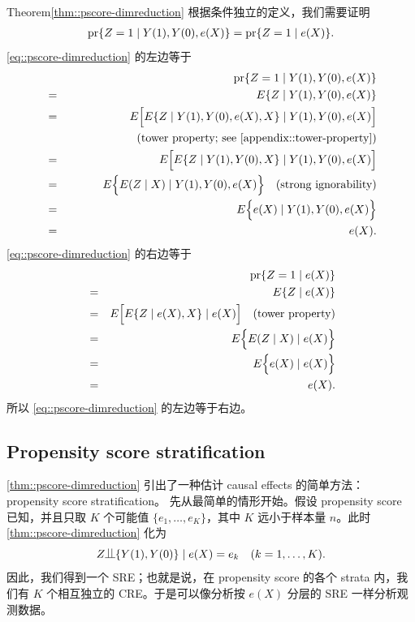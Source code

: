 \begin{myproof}{Theorem}{\cref{thm::pscore-dimreduction}}
根据条件独立的定义，我们需要证明
\begin{eqnarray}
\textup{pr}\{ Z=1\mid Y(1), Y(0), e(X)  \} = \textup{pr}\{ Z=1\mid e(X)  \} .
\label{eq::pscore-dimreduction}
\end{eqnarray}
\eqref{eq::pscore-dimreduction} 的左边等于
\begin{eqnarray*}
&&\pr\{ Z=1\mid Y(1), Y(0), e(X)  \}  \\
&=& E\{ Z \mid Y(1), Y(0), e(X)  \}  \\
&=& E\Big[   E\{ Z \mid Y(1), Y(0), e(X) , X  \}  \mid   Y(1), Y(0), e(X)    \Big]  \\
&&\quad  \quad  \quad  \quad   \quad \quad \text{(tower property; see \cref{appendix::tower-property})} \\
&=& E\Big[   E\{ Z \mid Y(1), Y(0),   X  \}  \mid   Y(1), Y(0), e(X)    \Big]  \\
&=& E\Big\{    E(Z \mid  X  )  \mid   Y(1), Y(0), e(X)    \Big\}  \quad \text{(strong ignorability)} \\
&=& E\Big\{   e(X) \mid   Y(1), Y(0), e(X)    \Big\} \\
&=& e(X).
\end{eqnarray*}
\eqref{eq::pscore-dimreduction} 的右边等于
\begin{eqnarray*}
&& \textup{pr}\{ Z=1\mid e(X)  \} \\
  &=&  E\{ Z \mid e(X)  \} \\
 &=& E\Big[   E\{ Z \mid e(X), X  \}  \mid e(X)  \Big ] \quad \text{(tower property)} \\
 &=& E\Big\{    E( Z \mid  X )  \mid e(X)  \Big \}   \\
 &=& E\Big\{   e(X)  \mid e(X)  \Big \} \\
 &=& e(X). 
\end{eqnarray*}
所以 \eqref{eq::pscore-dimreduction} 的左边等于右边。
\end{myproof}


\subsection{Propensity score stratification}
\label{sec::pscore-stratification}




\cref{thm::pscore-dimreduction} 引出了一种估计 causal effects 的简单方法：propensity score stratification。
先从最简单的情形开始。假设 propensity score 已知，并且只取 $K$ 个可能值 $\{ e_1,\ldots, e_K \}$，其中 $K$ 远小于样本量 $n$。此时 \cref{thm::pscore-dimreduction} 化为
$$
Z\ind \{ Y(1), Y(0)  \} \mid e(X) = e_k  \quad (k=1,\ldots, K).
$$
因此，我们得到一个 SRE；也就是说，在 propensity score 的各个 strata 内，我们有 $K$ 个相互独立的 CRE。于是可以像分析按 $e(X)$ 分层的 SRE 一样分析观测数据。



